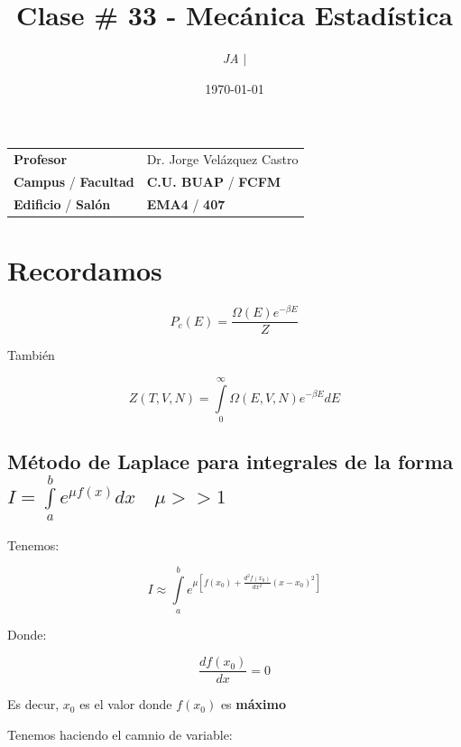 \documentclass{article}
\title{Clase \# 33 - Mecánica Estadística}
\author{\emph{JA} $\boldsymbol{\mid}$}
\date{\today}
\begin{document}
\maketitle



\begin{mybox}
\noindent\begin{tabular}{@{}ll}
	{\bfseries{Profesor}} & Dr. Jorge Velázquez Castro\\
	\textcolor{prussianblue}{\bfseries{Campus}} / \textcolor{trueblue}{\bfseries{Facultad}}  & \textcolor{prussianblue}{\bfseries{C.U. BUAP}} /  \textcolor{trueblue}{\bfseries{FCFM}} \\
	\textcolor{prussianblue}{\bfseries{Edificio}} /  \textcolor{trueblue}{\bfseries{Salón}}    & 	\textcolor{prussianblue}{\bfseries{EMA4}} /  \textcolor{trueblue}{\bfseries{407}}   
\end{tabular} 
\end{mybox} \vspace{1cm}

\tableofcontents

\vspace{2cm}

\section{Recordamos}

\[ P_{c} (E) = \frac{ \Omega(E) e^{-\beta E} }{Z} \]

También 

\[ Z(T,V,N) = \int\limits_{0}^{\infty}   \Omega(E,V,N) e^{-\beta E}  dE \]


\subsection{Método de Laplace para integrales de la forma $I = \int\limits_{a}^{b} e^{\mu f(x)} dx \quad \mu >> 1 $}


Tenemos:

\[ I \approx \int\limits_{a}^{b} e^{\mu \left[  f(x_{0})+ \frac{d^{2}f(x_{0})}{dx^{2}} (x-x_{0})^{2} \right]}  \]

Donde:

\[ \frac{ df(x_{0}) }{dx} =0    \]


Es decur, $x_{0}$ es el valor donde $f(x_{0})$ es \textbf{máximo}

Tenemos haciendo el camnio de variable:
\end{document}
